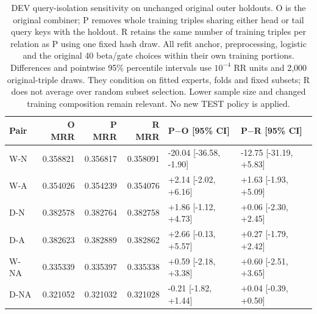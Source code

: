 \begin{table}[htbp]
\centering\footnotesize\setlength{\tabcolsep}{3pt}
\caption{DEV query-isolation sensitivity on unchanged original outer holdouts. O is the original combiner; P removes whole training triples sharing either head or tail query keys with the holdout. R retains the same number of training triples per relation as P using one fixed hash draw. All refit anchor, preprocessing, logistic and the original 40 beta/gate choices within their own training portions. Differences and pointwise 95\% percentile intervals use $10^{-4}$ RR units and 2,000 original-triple draws. They condition on fitted experts, folds and fixed subsets; R does not average over random subset selection. Lower sample size and changed training composition remain relevant. No new TEST policy is applied.}
\label{tab:query-purge}
\begin{tabular}{lrrrll}
\toprule
Pair & O MRR & P MRR & R MRR & P$-$O [95\% CI] & P$-$R [95\% CI]\\
\midrule
W-N & 0.358821 & 0.356817 & 0.358091 & -20.04 [-36.58, -1.90] & -12.75 [-31.19, +5.83]\\
W-A & 0.354026 & 0.354239 & 0.354076 & +2.14 [-2.02, +6.16] & +1.63 [-1.93, +5.09]\\
D-N & 0.382578 & 0.382764 & 0.382758 & +1.86 [-1.12, +4.73] & +0.06 [-2.30, +2.45]\\
D-A & 0.382623 & 0.382889 & 0.382862 & +2.66 [-0.13, +5.57] & +0.27 [-1.79, +2.42]\\
W-NA & 0.335339 & 0.335397 & 0.335338 & +0.59 [-2.18, +3.38] & +0.60 [-2.51, +3.65]\\
D-NA & 0.321052 & 0.321032 & 0.321028 & -0.21 [-1.82, +1.44] & +0.04 [-0.39, +0.50]\\
\bottomrule
\end{tabular}
\end{table}
